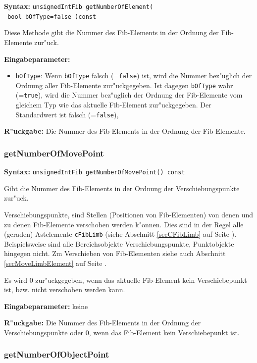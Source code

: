 \textbf{Syntax:} \verb|unsignedIntFib getNumberOfElement(| \\\verb| bool bOfType=false )const|

\bigskip\noindent
Diese Methode gibt die Nummer des Fib-Elements in der Ordnung der Fib-Elemente zur"uck.

\bigskip\noindent
\textbf{Eingabeparameter:}
\begin{itemize}
 \item \verb|bOfType|: Wenn \verb|bOfType| falsch (=\verb|false|) ist, wird die Nummer bez"uglich der Ordnung aller Fib-Elemente zur"uckgegeben. Ist dagegen \verb|bOfType| wahr (=\verb|true|), wird die Nummer bez"uglich der Ordnung der Fib-Elemente vom gleichem Typ wie das aktuelle Fib-Element zur"uckgegeben. Der Standardwert ist falsch (=\verb|false|),
\end{itemize}

\bigskip\noindent
\textbf{R"uckgabe:} Die Nummer des Fib-Elements in der Ordnung der Fib-Elemente.


\subsubsection{getNumberOfMovePoint}
\textbf{Syntax:} \verb|unsignedIntFib getNumberOfMovePoint() const|

\bigskip\noindent
Gibt die Nummer des Fib-Elements in der Ordnung der Verschiebungspunkte zur"uck.

Verschiebungspunkte, sind Stellen (Positionen von Fib-Elementen) von denen und zu denen Fib-Elemente verschoben werden k"onnen. Dies sind in der Regel alle (geraden) Astelemente \verb|cFibLimb| (siehe Abschnitt \ref{secCFibLimb} auf Seite \pageref{secCFibLimb} ). Beispielsweise sind alle Bereichsobjekte Verschiebungspunkte, Punktobjekte hingegen nicht. Zm Verschieben von Fib-Elementen siehe auch Abschnitt \ref{secMoveLimbElement} auf Seite \pageref{secMoveLimbElement} .

Es wird $0$ zur"uckgegeben, wenn das aktuelle Fib-Element kein Verschiebepunkt ist, bzw. nicht verschoben werden kann.

\bigskip\noindent
\textbf{Eingabeparameter:} keine

\bigskip\noindent
\textbf{R"uckgabe:} Die Nummer des Fib-Elements in der Ordnung der Verschiebungspunkte oder $0$, wenn das Fib-Element kein Verschiebepunkt ist.


\subsubsection{getNumberOfObjectPoint}

